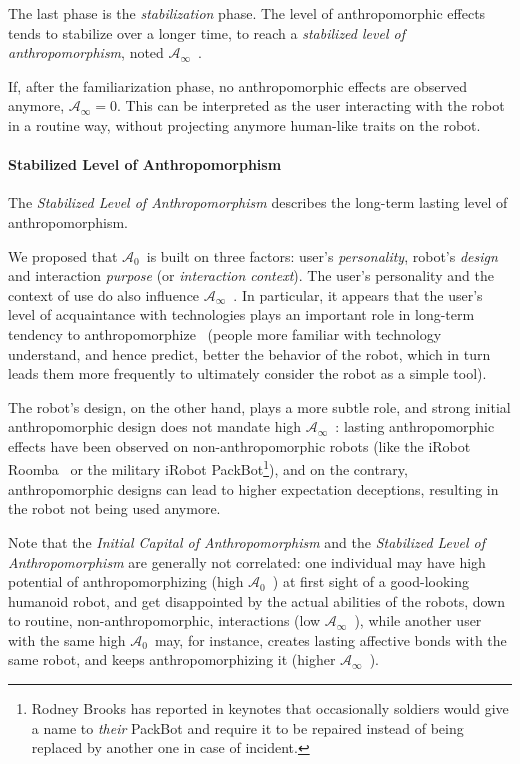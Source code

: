 \documentclass{frontiersSCNS} %
\newcommand{\ICA}{{$\mathcal{A}_0$~}}
\newcommand{\SLA}{{$\mathcal{A}_\infty$~}}
\newcommand{\sla}{{\mathcal{A}_\infty}}
\begin{document}
The last phase is the \emph{stabilization} phase. The level of anthropomorphic
effects tends to stabilize over a longer time, to reach a \emph{stabilized
level of anthropomorphism}, noted \SLA.

If, after the familiarization phase, no anthropomorphic effects are observed
anymore, $\sla = 0$. This can be interpreted as the user interacting with the
robot in a routine way, without projecting anymore human-like traits on the
robot.


\paragraph{Stabilized Level of Anthropomorphism}

The \emph{Stabilized Level of Anthropomorphism} describes the long-term lasting level of
anthropomorphism.

We proposed that \ICA is built on three factors: user's \emph{personality},
robot's \emph{design} and interaction \emph{purpose} (or \emph{interaction
context}). The user's personality and the context of use do also influence \SLA.
In particular, it appears that the user's level of acquaintance with
technologies plays an important role in long-term tendency to
anthropomorphize~\cite{fink_living_2013} (people more familiar with technology
understand, and hence predict, better the behavior of the robot, which in turn
leads them more frequently to ultimately consider the robot as a simple tool).

The robot's design, on the other hand, plays a more subtle role, and strong
initial anthropomorphic design does not mandate high \SLA: lasting
anthropomorphic effects have been observed on non-anthropomorphic robots (like
the iRobot Roomba~\cite{fink_living_2013} or the military iRobot
PackBot\footnote{Rodney Brooks has reported in keynotes that occasionally
soldiers would give a name to \emph{their} PackBot and require it to be repaired
instead of being replaced by another one in case of incident.}), and on the
contrary, anthropomorphic designs can lead to higher expectation deceptions,
resulting in the robot not being used anymore.

Note that the \emph{Initial Capital of Anthropomorphism} and the
\emph{Stabilized Level of Anthropomorphism} are generally not correlated: one
individual may have high potential of anthropomorphizing (high \ICA) at first
sight of a good-looking humanoid robot, and get disappointed by the actual
abilities of the robots, down to routine, non-anthropomorphic, interactions (low
\SLA), while another user with the same high \ICA may, for instance, creates
lasting affective bonds with the same robot, and keeps anthropomorphizing it
(higher \SLA).
\end{document}
